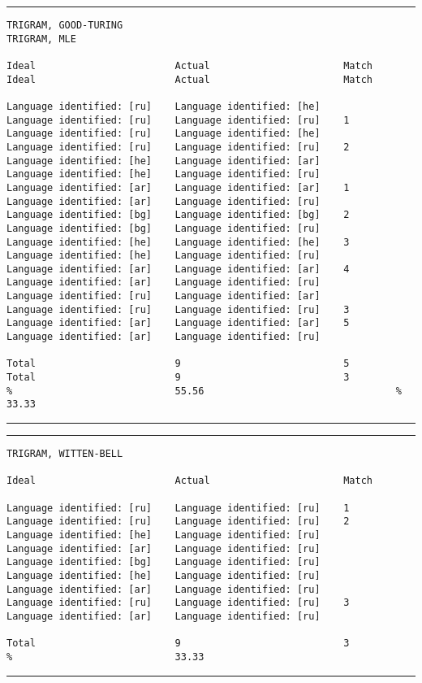 \tiny
\hrule\vskip4pt
\begin{verbatim}
TRIGRAM, GOOD-TURING                                               TRIGRAM, MLE

Ideal                        Actual                       Match    Ideal                        Actual                       Match

Language identified: [ru]    Language identified: [he]             Language identified: [ru]    Language identified: [ru]    1
Language identified: [ru]    Language identified: [he]             Language identified: [ru]    Language identified: [ru]    2
Language identified: [he]    Language identified: [ar]             Language identified: [he]    Language identified: [ru]
Language identified: [ar]    Language identified: [ar]    1        Language identified: [ar]    Language identified: [ru]
Language identified: [bg]    Language identified: [bg]    2        Language identified: [bg]    Language identified: [ru]
Language identified: [he]    Language identified: [he]    3        Language identified: [he]    Language identified: [ru]
Language identified: [ar]    Language identified: [ar]    4        Language identified: [ar]    Language identified: [ru]
Language identified: [ru]    Language identified: [ar]             Language identified: [ru]    Language identified: [ru]    3
Language identified: [ar]    Language identified: [ar]    5        Language identified: [ar]    Language identified: [ru]

Total                        9                            5        Total                        9                            3
%                            55.56                                 %                            33.33
\end{verbatim}
\vskip4pt\hrule


\tiny
\hrule\vskip4pt
\begin{verbatim}
TRIGRAM, WITTEN-BELL

Ideal                        Actual                       Match

Language identified: [ru]    Language identified: [ru]    1
Language identified: [ru]    Language identified: [ru]    2
Language identified: [he]    Language identified: [ru]
Language identified: [ar]    Language identified: [ru]
Language identified: [bg]    Language identified: [ru]
Language identified: [he]    Language identified: [ru]
Language identified: [ar]    Language identified: [ru]
Language identified: [ru]    Language identified: [ru]    3
Language identified: [ar]    Language identified: [ru]

Total                        9                            3
%                            33.33
\end{verbatim}
\vskip4pt\hrule


